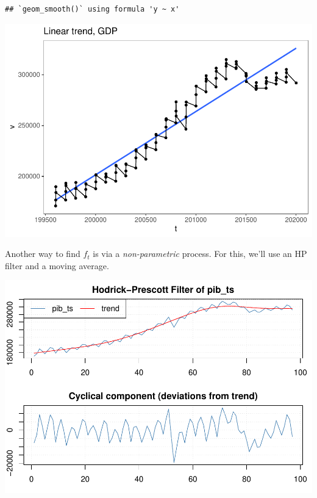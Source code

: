 \documentclass[]{article}
\newenvironment{Shaded}{\begin{snugshade}}{\end{snugshade}}
\newcommand{\DataTypeTok}[1]{\textcolor[rgb]{0.13,0.29,0.53}{#1}}
\newcommand{\DecValTok}[1]{\textcolor[rgb]{0.00,0.00,0.81}{#1}}
\newcommand{\KeywordTok}[1]{\textcolor[rgb]{0.13,0.29,0.53}{\textbf{#1}}}
\newcommand{\NormalTok}[1]{#1}
\newcommand{\OperatorTok}[1]{\textcolor[rgb]{0.81,0.36,0.00}{\textbf{#1}}}
\newcommand{\StringTok}[1]{\textcolor[rgb]{0.31,0.60,0.02}{#1}}
\begin{document}
\begin{verbatim}
## `geom_smooth()` using formula 'y ~ x'
\end{verbatim}

\includegraphics{Econo2_P5_files/figure-latex/parametric linear-1.pdf}

Another way to find \(f_t\) is via a \emph{non-parametric} process. For
this, we'll use an HP filter and a moving average.

\begin{Shaded}
\end{Shaded}

\includegraphics{Econo2_P5_files/figure-latex/hp filter-1.pdf}
\end{document}
